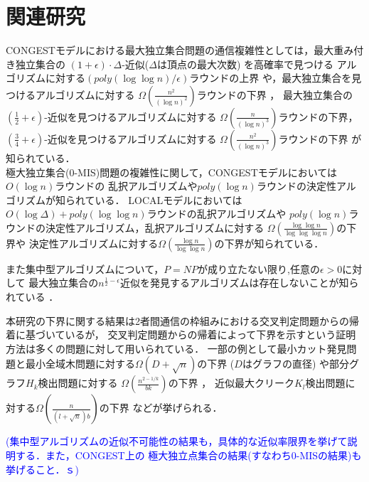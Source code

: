 \documentclass[12pt]{thesis}
\newcommand{\Izumi}[1]{\textcolor{blue}{(#1)}}
\newcommand{\CONGEST}{\textsf{CONGEST}}
\newcommand{\LOCAL}{\textsf{LOCAL}}
\theoremstyle{definition}
\begin{document}
\section{関連研究} 
{\CONGEST}モデルにおける最大独立集合問題の通信複雑性としては，最大重み付き独立集合の
$(1 + \epsilon) \cdot \Delta$-近似($\Delta$は頂点の最大次数) を高確率で見つける
アルゴリズムに対する$\left(poly(\log \log n)/\epsilon \right)$ラウンドの上界
\cite{kawarabayashi2019improved} や，最大独立集合を見つけるアルゴリズムに対する
$\Omega \left(\frac{n^{2}}{(\log n)^{2}}\right)$ラウンドの下界 \cite{censor2017quadratic}，
最大独立集合の$(\frac{1}{2} + \epsilon)$-近似を見つけるアルゴリズムに対する
$\Omega \left(\frac{n}{(\log n)^{3}}\right)$ラウンドの下界，
$(\frac{3}{4} + \epsilon)$-近似を見つけるアルゴリズムに対する
$\Omega \left(\frac{n^{2}}{(\log n)^{3}}\right)$ラウンドの下界 \cite{efron2020beyond} が知られている．\\
極大独立集合(0-MIS)問題の複雑性に関して，{\CONGEST}モデルにおいては$O(\log n)$ラウンドの
乱択アルゴリズム\cite{luby1986simple}や$poly(\log n)$ラウンドの決定性アルゴリズム\cite{rozhovn2020polylogarithmic}が知られている．
{\LOCAL}モデルにおいては$O(\log \Delta) + poly(\log \log n)$ラウンドの乱択アルゴリズムや
$poly(\log n)$ラウンドの決定性アルゴリズム\cite{rozhovn2020polylogarithmic}，乱択アルゴリズムに対する
$\Omega \left(\frac{\log \log n}{\log \log \log n} \right)$の下界や
決定性アルゴリズムに対する$\Omega \left(\frac{\log n}{\log \log n} \right)$の下界\cite{balliu2019lower}が知られている．

また集中型アルゴリズムについて，$P = NP$が成り立たない限り,任意の$\epsilon > 0$に対して
最大独立集合の$n^{\frac{1}{2} - \epsilon}$近似を発見するアルゴリズムは存在しないことが知られている \cite{haastad1999clique}．
 
本研究の下界に関する結果は2者間通信の枠組みにおける交叉判定問題からの帰着に基づいているが，
交叉判定問題からの帰着によって下界を示すという証明方法は多くの問題に対して用いられている．
一部の例として最小カット発見問題と最小全域木問題に対する$\Omega (D + \sqrt{n})$の下界
($D$はグラフの直径) \cite{sarma2012distributed}や部分グラフ$H_{k}$検出問題に対する
$\Omega \left(\frac{n^{2 - 1/k}}{bk}\right)$の下界 \cite{fischer2018possibilities}，
近似最大クリーク$K_{l}$検出問題に対する$\Omega \left(\frac{n}{(l + \sqrt{n})b}\right)$の下界
 \cite{czumaj2020detecting}などが挙げられる．

\Izumi{集中型アルゴリズムの近似不可能性の結果も，具体的な近似率限界を挙げて説明する．また，CONGEST上の
極大独立点集合の結果(すなわち0-MISの結果)も挙げること．ｓ}
\end{document}
